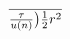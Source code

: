 \documentclass[preview]{standalone}
\begin{document}
\begin{align*}
\over {\frac {\tau} {u(n)}}\big) \frac {1} {2} r^2
\end{align*}
\end{document}
